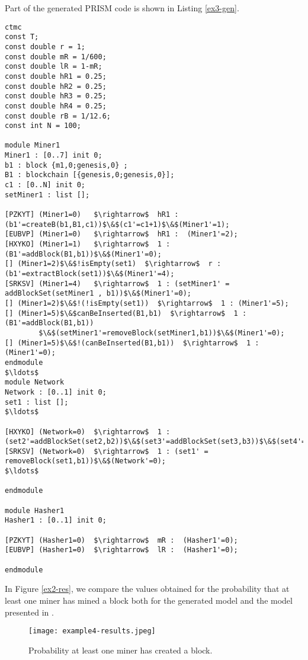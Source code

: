 Part of the generated PRISM code is shown in Listing \ref{ex3-gen}. 
\begin{lstlisting}[style=prism-color,caption={Generated PRISM program for the Peer-To-Peer Protocol.},captionpos=b,label={ex3-gen}]
ctmc
const T;
const double r = 1;
const double mR = 1/600;
const double lR = 1-mR;
const double hR1 = 0.25;
const double hR2 = 0.25;
const double hR3 = 0.25;
const double hR4 = 0.25;
const double rB = 1/12.6;
const int N = 100;

module Miner1
Miner1 : [0..7] init 0;
b1 : block {m1,0;genesis,0} ; 
B1 : blockchain [{genesis,0;genesis,0}]; 
c1 : [0..N] init 0; 
setMiner1 : list []; 

[PZKYT] (Miner1=0)   $\rightarrow$  hR1 : (b1'=createB(b1,B1,c1))$\&$(c1'=c1+1)$\&$(Miner1'=1); 
[EUBVP] (Miner1=0)   $\rightarrow$  hR1 :  (Miner1'=2); 
[HXYKO] (Miner1=1)   $\rightarrow$  1 : (B1'=addBlock(B1,b1))$\&$(Miner1'=0); 
[] (Miner1=2)$\&$!isEmpty(set1)  $\rightarrow$  r : (b1'=extractBlock(set1))$\&$(Miner1'=4); 
[SRKSV] (Miner1=4)   $\rightarrow$  1 : (setMiner1' = addBlockSet(setMiner1 , b1))$\&$(Miner1'=0); 
[] (Miner1=2)$\&$!(!isEmpty(set1))  $\rightarrow$  1 : (Miner1'=5); 
[] (Miner1=5)$\&$canBeInserted(B1,b1)  $\rightarrow$  1 : (B1'=addBlock(B1,b1))
		$\&$(setMiner1'=removeBlock(setMiner1,b1))$\&$(Miner1'=0); 
[] (Miner1=5)$\&$!(canBeInserted(B1,b1))  $\rightarrow$  1 : (Miner1'=0);
endmodule
$\ldots$
module Network
Network : [0..1] init 0;
set1 : list []; 
$\ldots$

[HXYKO] (Network=0)  $\rightarrow$  1 : (set2'=addBlockSet(set2,b2))$\&$(set3'=addBlockSet(set3,b3))$\&$(set4'=addBlockSet(set4,b4))$\&$(Network'=0); 
[SRKSV] (Network=0)  $\rightarrow$  1 : (set1' = removeBlock(set1,b1))$\&$(Network'=0); 
$\ldots$

endmodule

module Hasher1
Hasher1 : [0..1] init 0;

[PZKYT] (Hasher1=0)  $\rightarrow$  mR :  (Hasher1'=0); 
[EUBVP] (Hasher1=0)  $\rightarrow$  lR :  (Hasher1'=0); 

endmodule
\end{lstlisting}


In Figure \ref{ex2-res}, we compare the values obtained for the probability that at least one miner has mined a block both for the generated model and the model presented in \cite{DBLP:journals/concurrency/BistarelliNGLMV23}.
\begin{figure}[h]
\centering
\texttt{[image: example4-results.jpeg]}	
\caption{Probability at least one miner has created a block.}
\label{ex3-res}
\end{figure}

